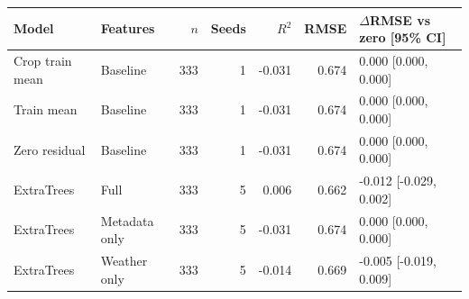 \begin{tabular}{llrrrrl}
\toprule
Model & Features & $n$ & Seeds & $R^2$ & RMSE & $\Delta$RMSE vs zero [95\% CI] \\
\midrule
Crop train mean & Baseline & 333 & 1 & -0.031 & 0.674 & 0.000 [0.000, 0.000] \\
Train mean & Baseline & 333 & 1 & -0.031 & 0.674 & 0.000 [0.000, 0.000] \\
Zero residual & Baseline & 333 & 1 & -0.031 & 0.674 & 0.000 [0.000, 0.000] \\
ExtraTrees & Full & 333 & 5 & 0.006 & 0.662 & -0.012 [-0.029, 0.002] \\
ExtraTrees & Metadata only & 333 & 5 & -0.031 & 0.674 & 0.000 [0.000, 0.000] \\
ExtraTrees & Weather only & 333 & 5 & -0.014 & 0.669 & -0.005 [-0.019, 0.009] \\
\bottomrule
\end{tabular}
